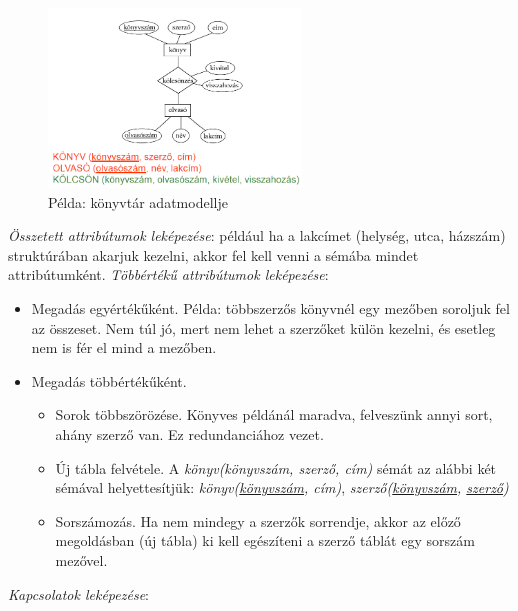 \documentclass[margin=0px]{article}
\begin{document}
\begin{figure}[H]
    \centering
    \includegraphics[width=0.6\textwidth]{img/ek7.png}
    \caption{Példa: könyvtár adatmodellje}
\end{figure}
\textit{Összetett attribútumok leképezése}: például ha a lakcímet (helység, utca, házszám) struktúrában akarjuk kezelni, akkor fel kell venni a sémába mindet attribútumként.
\textit{Többértékű attribútumok leképezése}:
\begin{itemize}
    \item Megadás egyértékűként. Példa: többszerzős könyvnél egy mezőben soroljuk fel az összeset. Nem túl jó, mert nem lehet a szerzőket külön kezelni, és esetleg nem is fér el mind a mezőben.
    \item Megadás többértékűként.
          \begin{itemize}
              \item Sorok többszörözése. Könyves példánál maradva, felveszünk annyi sort, ahány szerző van. Ez redundanciához vezet.
              \item Új tábla felvétele. A \textit{könyv(könyvszám, szerző, cím)} sémát az alábbi két sémával helyettesítjük: \textit{könyv(\underline{könyvszám}, cím)}, \textit{szerző(\underline{könyvszám}, \underline{szerző})}
              \item Sorszámozás. Ha nem mindegy a szerzők sorrendje, akkor az előző megoldásban (új tábla) ki kell egészíteni a szerző táblát egy sorszám mezővel.
          \end{itemize}
\end{itemize}
\textit{Kapcsolatok leképezése}:
\end{document}

